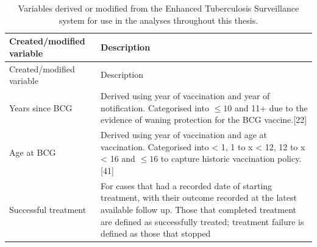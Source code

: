 \documentclass[11pt,twoside]{bristolthesis}
\begin{document}
  \begin{longtable}[]{@{}ll@{}}
  \caption{\label{tab:created-var} Variables derived or modified from the Enhanced Tuberculosis Surveillance system for use in the analyses throughout this thesis.}\tabularnewline
  \toprule
  \begin{minipage}[b]{0.33\columnwidth}\raggedright
  Created/modified variable\strut
  \end{minipage} & \begin{minipage}[b]{0.62\columnwidth}\raggedright
  Description\strut
  \end{minipage}\tabularnewline
  \midrule
  \endfirsthead
  \toprule
  \begin{minipage}[b]{0.33\columnwidth}\raggedright
  Created/modified variable\strut
  \end{minipage} & \begin{minipage}[b]{0.62\columnwidth}\raggedright
  Description\strut
  \end{minipage}\tabularnewline
  \midrule
  \endhead
  \begin{minipage}[t]{0.33\columnwidth}\raggedright
  Years since BCG\strut
  \end{minipage} & \begin{minipage}[t]{0.62\columnwidth}\raggedright
  Derived using year of vaccination and year of
  notification. Categorised into \(\leq 10\) and 11+
  due to the evidence of waning protection for the
  BCG vaccine.{[}22{]}\strut
  \end{minipage}\tabularnewline
  \begin{minipage}[t]{0.33\columnwidth}\raggedright
  Age at BCG\strut
  \end{minipage} & \begin{minipage}[t]{0.62\columnwidth}\raggedright
  Derived using year of vaccination and age at
  vaccination. Categorised into \textless{} 1, 1 to x \textless{} 12, 12
  to x \textless{} 16 and \(\leq 16\) to capture historic
  vaccination policy.{[}41{]}\strut
  \end{minipage}\tabularnewline
  \begin{minipage}[t]{0.33\columnwidth}\raggedright
  Successful treatment\strut
  \end{minipage} & \begin{minipage}[t]{0.62\columnwidth}\raggedright
  For cases that had a recorded date of starting
  treatment, with their outcome recorded at the
  latest available follow up. Those that completed
  treatment are defined as successfully treated;
  treatment failure is defined as those that stopped

\end{minipage}
\end{longtable}
\end{document}
